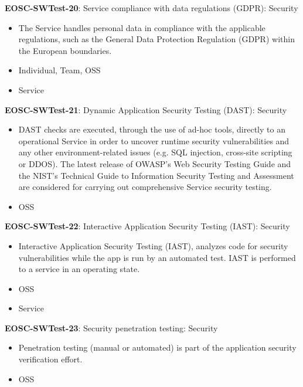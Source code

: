 \textbf{EOSC-SWTest-20}: Service compliance with data regulations (GDPR): Security

\begin{itemize}
    \item The Service handles personal data in compliance with the applicable regulations, such as the General Data Protection Regulation (GDPR) within the European boundaries. \cite{orviz_fernandez_eosc-synergy_2020}
    \item Individual, Team, OSS
    \item Service
\end{itemize}

\textbf{EOSC-SWTest-21}: Dynamic Application Security Testing (DAST): Security

\begin{itemize}
    \item DAST checks are executed, through the use of ad-hoc tools, directly to an operational Service in order to uncover runtime security vulnerabilities and any other environment-related issues (e.g. SQL injection, cross-site scripting or DDOS). The latest release of OWASP's Web Security Testing Guide and the NIST's Technical Guide to Information Security Testing and Assessment are considered for carrying out comprehensive Service security testing. \cite{orviz_fernandez_eosc-synergy_2020}
    \item OSS
\end{itemize}

\textbf{EOSC-SWTest-22}: Interactive Application Security Testing (IAST): Security

\begin{itemize}
    \item Interactive Application Security Testing (IAST), analyzes code for security vulnerabilities while the app is run by an automated test. IAST is performed to a service in an operating state. \cite{orviz_fernandez_eosc-synergy_2020}
    \item OSS
    \item Service
\end{itemize}

\textbf{EOSC-SWTest-23}: Security penetration testing: Security

\begin{itemize}
    \item Penetration testing (manual or automated) is part of the application security verification effort. \cite{orviz_fernandez_eosc-synergy_2020}
    \item OSS
\end{itemize}


